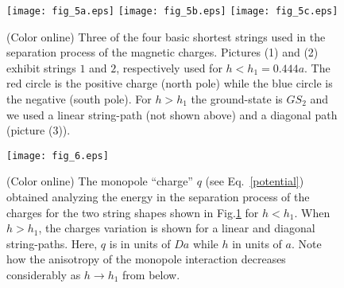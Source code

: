 \documentclass[aps,prb,twocolumn,floatfix,showpacs,amsmath,amssymb]{revtex4}
\begin{document}
\begin{figure}
\texttt{[image: fig\_5a.eps]}
\texttt{[image: fig\_5b.eps]}
\texttt{[image: fig\_5c.eps]}
\caption{\label{cena10} (Color online) Three of the four basic shortest
strings used in the separation process of the magnetic charges.
Pictures (1) and (2) exhibit strings $1$ and $2$,
respectively used for $h<h_1=0.444a$. The red circle is the positive charge (north pole)
while the blue circle is the negative (south pole). For $h>h_1$
the ground-state is $GS_2$ and we used a linear string-path (not
shown above) and a diagonal path (picture (3)).}
\end{figure}

\begin{figure}
\texttt{[image: fig\_6.eps]}
\caption{\label{Coulomb} (Color online) The monopole ``charge''
$q$ (see Eq.~\ref{potential}) obtained analyzing the energy in the
separation process of the charges for the two string shapes shown
in Fig.\ref{cena10} for $h<h_1$. When $h>h_1$, the charges
variation is shown for a linear and diagonal string-paths. Here,
$q$ is in units of $Da$ while $h$ in units of $a$. Note how the
anisotropy of the monopole interaction decreases considerably as
$h\rightarrow h_{1}$ from below.} 
\end{figure}
\end{document}
